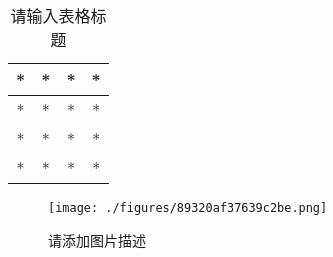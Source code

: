 
\begin{table}[ht]
\centering
\caption{请输入表格标题}\label{tab_test1b_1}
\begin{tabular}{|c|c|c|c|}
\hline
* & * & * & * \\
\hline
* & * & * & * \\
\hline
* & * & * & * \\
\hline
* & * & * & * \\
\hline
\end{tabular}
\end{table}

\begin{figure}[ht]
\centering
\texttt{[image: ./figures/89320af37639c2be.png]}
\caption{请添加图片描述} \label{fig_test1b_1}
\end{figure}
